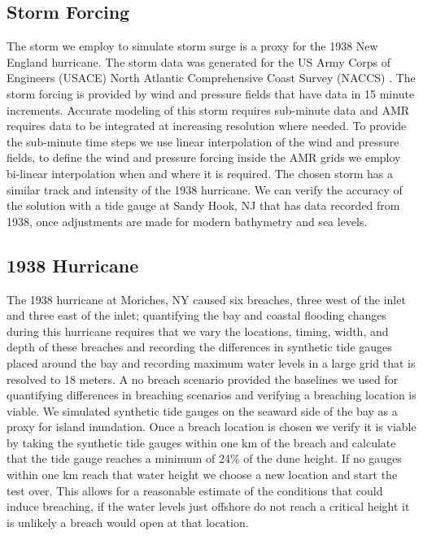 \documentclass{coastal_paper}
\begin{document}
\subsection*{Storm Forcing}
The storm we employ to simulate storm surge is a proxy for the 1938 New England hurricane. The storm data was generated for the US Army Corps of Engineers (USACE) North Atlantic Comprehensive Coast Survey (NACCS) \citep{cialone2015north}. The storm forcing is provided by wind and pressure fields that have data in 15 minute increments. Accurate modeling of this storm requires sub-minute data and AMR requires data to be integrated at increasing resolution where needed. To provide the sub-minute time steps we use linear interpolation of the wind and pressure fields, to define the wind and pressure forcing inside the AMR grids we employ bi-linear interpolation when and where it is required. The chosen storm has a similar track and intensity of the 1938 hurricane. We can verify the accuracy of the solution with a tide gauge at Sandy Hook, NJ that has data recorded from 1938, once adjustments are made for modern bathymetry and sea levels. 

\subsection*{1938 Hurricane}
The 1938 hurricane at Moriches, NY caused six breaches, three west of the inlet and three east of the inlet; quantifying the bay and coastal flooding changes during this hurricane requires that we vary the locations, timing, width, and depth of these breaches and recording the differences in synthetic tide gauges placed around the bay and recording maximum water levels in a large grid that is resolved to 18 meters. A no breach scenario provided the baselines we used for quantifying differences in breaching scenarios and verifying a breaching location is viable. We simulated synthetic tide gauges on the seaward side of the bay as a proxy for island inundation. Once a breach location is chosen we verify it is viable by taking the synthetic tide gauges within one km of the breach and calculate that the tide gauge reaches a minimum of 24\% of the dune height. If no gauges within one km reach that water height we choose a new location and start the test over. This allows for a reasonable estimate of the conditions that could induce breaching, if the water levels just offshore do not reach a critical height it is unlikely a breach would open at that location.
\end{document}
